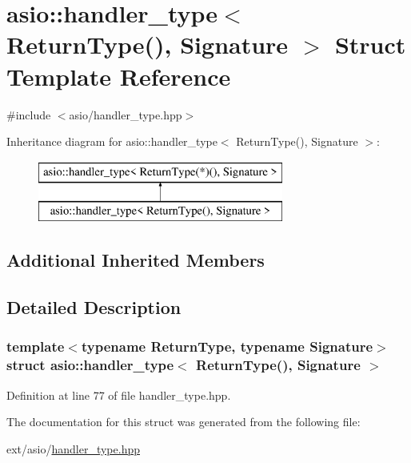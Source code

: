 \hypertarget{structasio_1_1handler__type_3_01_return_type_07_08_00_01_signature_01_4}{}\section{asio\+:\+:handler\+\_\+type$<$ Return\+Type(), Signature $>$ Struct Template Reference}
\label{structasio_1_1handler__type_3_01_return_type_07_08_00_01_signature_01_4}


{\ttfamily \#include $<$asio/handler\+\_\+type.\+hpp$>$}

Inheritance diagram for asio\+:\+:handler\+\_\+type$<$ Return\+Type(), Signature $>$\+:\begin{figure}[H]
\begin{center}
\leavevmode
\includegraphics[height=2.000000cm]{structasio_1_1handler__type_3_01_return_type_07_08_00_01_signature_01_4}
\end{center}
\end{figure}
\subsection*{Additional Inherited Members}


\subsection{Detailed Description}
\subsubsection*{template$<$typename Return\+Type, typename Signature$>$struct asio\+::handler\+\_\+type$<$ Return\+Type(), Signature $>$}



Definition at line 77 of file handler\+\_\+type.\+hpp.



The documentation for this struct was generated from the following file\+:\begin{DoxyCompactItemize}
\item 
ext/asio/\hyperlink{handler__type_8hpp}{handler\+\_\+type.\+hpp}\end{DoxyCompactItemize}
